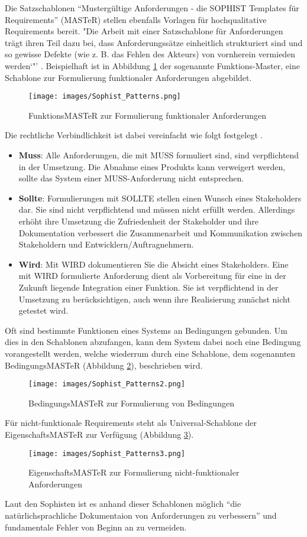 Die Satzschablonen "`Mustergültige Anforderungen - die SOPHIST Templates für Requirements"' (MASTeR) stellen ebenfalls Vorlagen für hochqualitative Requirements bereit. "Die Arbeit mit einer Satzschablone für Anforderungen trägt ihren Teil dazu bei, dass Anforderungssätze
einheitlich strukturiert sind und so gewisse Defekte (wie z. B. das Fehlen des
Akteurs) von vornherein vermieden werden`"' \cite{JPQRSSV16}. Beispielhaft ist in Abbildung \ref{img:Func_MASTeR} der sogenannte Funktions-Master, eine Schablone zur Formulierung funktionaler Anforderungen abgebildet.
\begin{figure}
	\centering
	\texttt{[image: images/Sophist\_Patterns.png]}
	\caption{FunktionsMASTeR zur Formulierung funktionaler Anforderungen \cite{JPQRSSV16}}
	\label{img:Func_MASTeR}
\end{figure}
Die rechtliche Verbindlichkeit ist dabei vereinfacht wie folgt festgelegt \cite{JPQRSSV16}. 
\begin{itemize}
	\item[] \textbf{Muss}: Alle Anforderungen, die mit MUSS formuliert sind, sind verpflichtend
	in der Umsetzung. Die Abnahme eines Produkts kann verweigert werden, sollte das System einer MUSS-Anforderung nicht entsprechen.
	\item[] \textbf{Sollte}: Formulierungen mit SOLLTE stellen einen Wunsch eines Stakeholders
	dar. Sie sind nicht verpflichtend und müssen nicht erfüllt werden. Allerdings erhöht ihre Umsetzung die Zufriedenheit der Stakeholder und ihre Dokumentation verbessert die Zusammenarbeit und Kommunikation zwischen Stakeholdern und Entwicklern/Auftragnehmern.
	\item[] \textbf{Wird}: Mit WIRD dokumentieren Sie die Absicht eines Stakeholders. Eine mit WIRD formulierte Anforderung dient als Vorbereitung für eine in der Zukunft liegende Integration einer Funktion. Sie ist verpflichtend in der Umsetzung zu berücksichtigen, auch wenn ihre Realisierung zunächst nicht getestet wird.
\end{itemize}
Oft sind bestimmte Funktionen eines Systems an Bedingungen gebunden. Um dies in den Schablonen abzufangen, kann dem System dabei noch eine Bedingung vorangestellt werden, welche wiederrum durch eine Schablone, dem sogenannten BedingungsMASTeR (Abbildung \ref{img:Cond_MASTeR}), beschrieben wird. 
\begin{figure}
	\centering
	\texttt{[image: images/Sophist\_Patterns2.png]}
	\caption{BedingungsMASTeR zur Formulierung von Bedingungen \cite{JPQRSSV16}}
	\label{img:Cond_MASTeR}
\end{figure}
Für nicht-funktionale Requirements steht als Universal-Schablone der EigenschaftsMASTeR zur Verfügung (Abbildung \ref{img:Prop_MASTeR}).
\begin{figure}
	\centering
	\texttt{[image: images/Sophist\_Patterns3.png]}
	\caption{EigenschaftsMASTeR zur Formulierung nicht-funktionaler Anforderungen \cite{JPQRSSV16}}
	\label{img:Prop_MASTeR}
\end{figure}
Laut den Sophisten ist es anhand dieser Schablonen möglich "`die natürlichsprachliche Dokumentaion von Anforderungen zu verbessern"' \cite{JPQRSSV16} und fundamentale Fehler von Beginn an zu vermeiden.

